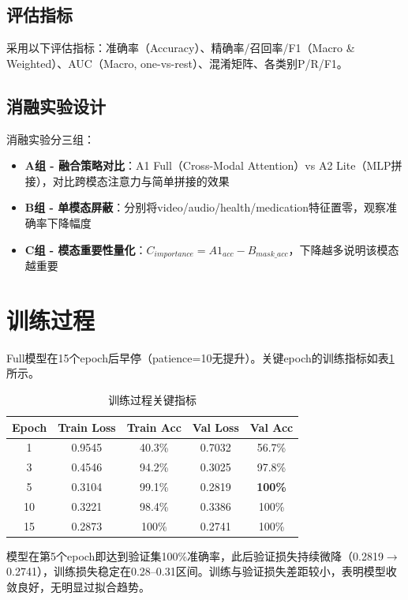 \subsection{评估指标}

采用以下评估指标：准确率（Accuracy）、精确率/召回率/F1（Macro \& Weighted）、AUC（Macro, one-vs-rest）、混淆矩阵、各类别P/R/F1。

\subsection{消融实验设计}

消融实验分三组：

\begin{itemize}
    \item \textbf{A组 - 融合策略对比}：A1 Full（Cross-Modal Attention）vs A2 Lite（MLP拼接），对比跨模态注意力与简单拼接的效果
    \item \textbf{B组 - 单模态屏蔽}：分别将video/audio/health/medication特征置零，观察准确率下降幅度
    \item \textbf{C组 - 模态重要性量化}：$C_{importance} = A1_{acc} - B_{mask\_acc}$，下降越多说明该模态越重要
\end{itemize}

\section{训练过程}

Full模型在15个epoch后早停（patience=10无提升）。关键epoch的训练指标如表\ref{tab:training}所示。

\begin{table}[H]
\centering
\caption{训练过程关键指标}
\label{tab:training}
\begin{tabular}{ccccc}
\toprule
Epoch & Train Loss & Train Acc & Val Loss & Val Acc \\
\midrule
1 & 0.9545 & 40.3\% & 0.7032 & 56.7\% \\
3 & 0.4546 & 94.2\% & 0.3025 & 97.8\% \\
5 & 0.3104 & 99.1\% & 0.2819 & \textbf{100\%} \\
10 & 0.3221 & 98.4\% & 0.3386 & 100\% \\
15 & 0.2873 & 100\% & 0.2741 & 100\% \\
\bottomrule
\end{tabular}
\end{table}

模型在第5个epoch即达到验证集100\%准确率，此后验证损失持续微降（0.2819$\to$0.2741），训练损失稳定在0.28--0.31区间。训练与验证损失差距较小，表明模型收敛良好，无明显过拟合趋势。

